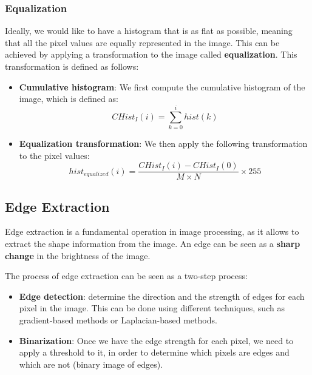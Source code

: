 \subsubsection{Equalization}
Ideally, we would like to have a histogram that is as flat as possible, meaning that all the pixel 
values are equally represented in the image. This can be achieved by applying a transformation to the image
called \textbf{equalization}. This transformation is defined as follows:
\begin{itemize}
    \item \textbf{Cumulative histogram}: We first compute the cumulative histogram of the image, which is defined as:
    \[ CHist_I(i) = \sum_{k=0}^{i} hist(k) \]
    \item \textbf{Equalization transformation}: We then apply the following transformation to the pixel values:
    \[ hist_{equalized}(i) = \frac{CHist_I(i) - CHist_I(0)}{M \times N} \times 255 \]
\end{itemize}

\subsection{Edge Extraction}
Edge extraction is a fundamental operation in image processing, as it allows to extract the shape 
information from the image. An edge can be seen as a \textbf{sharp change} in the brightness of the image.

The process of edge extraction can be seen as a two-step process:
\begin{itemize}
    \item \textbf{Edge detection}: determine the direction and the strength of edges for each pixel in the image.
    This can be done using different techniques, such as gradient-based methods or Laplacian-based methods.
    \item \textbf{Binarization}: Once we have the edge strength for each pixel, we need to apply a threshold to it, 
    in order to determine which pixels are edges and which are not (binary image of edges).
\end{itemize}

